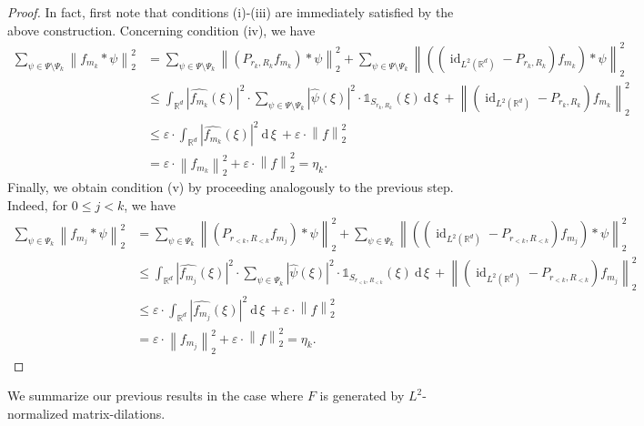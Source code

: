 \documentclass[11pt]{amsart}
\newcommand{\R}{{\mathbb{R}}}
\newcommand{\dxi}{\:\mathrm{d}\,\xi\:}
\newcommand{\norm}[1]{\ensuremath{\left\lVert\text{}#1\text{}\right\rVert}}
\DeclareMathOperator{\id}{id}
\newenvironment{proof sketch} {\textit{Proof sketch.}}{}
\begin{document}
\begin{proof}
    In fact, first note that conditions (i)-(iii) are immediately satisfied by the above construction. Concerning condition (iv), we have 
      \begin{align*}
        \sum_{\psi \in \Psi\setminus\Psi_k} \norm{f_{m_k}*\psi}_2^2 
        &= \sum_{\psi \in \Psi\setminus\Psi_k} \norm{(P_{r_k,R_k}f_{m_k})*\psi}_2^2 + \sum_{\psi \in \Psi\setminus\Psi_k} \norm{((\id_{L^2(\R^d)}-P_{r_k,R_k})f_{m_k})*\psi}_2^2 \\
        &\leq \int_{\R^d} |\widehat{f_{m_k}}(\xi)|^2 \cdot \sum_{\psi \in \Psi\setminus\Psi_k} |\widehat{\psi}(\xi)|^2 \cdot \mathds{1}_{S_{r_k,R_k}}(\xi)\dxi + \norm{(\id_{L^2(\R^d)}-P_{r_k,R_k})f_{m_k}}_2^2 \\
        &\leq \varepsilon \cdot \int_{\R^d} |\widehat{f_{m_k}}(\xi)|^2 \dxi + \varepsilon \cdot \norm{f}_2^2 \\
        &= \varepsilon \cdot \norm{f_{m_k}}_2^2+\varepsilon \cdot \norm{f}_2^2 = \eta_k.
      \end{align*}  
      Finally, we obtain condition (v) by proceeding analogously to the previous step. Indeed, for $0\leq j<k$, we have
      \begin{align*}
        \sum_{\psi \in \Psi_k} \norm{f_{m_j}*\psi}_2^2 
        &= \sum_{\psi \in \Psi_k} \norm{(P_{r_{<k},R_{<k}}f_{m_j})*\psi}_2^2 + \sum_{\psi \in \Psi_k} \norm{((\id_{L^2(\R^d)}-P_{r_{<k},R_{<k}})f_{m_j})*\psi}_2^2 \\
        &\leq \int_{\R^d} |\widehat{f_{m_j}}(\xi)|^2 \cdot \sum_{\psi \in \Psi_k} |\widehat{\psi}(\xi)|^2 \cdot \mathds{1}_{S_{r_{<k},R_{<k}}}(\xi)\dxi + \norm{(\id_{L^2(\R^d)}-P_{r_{<k},R_{<k}})f_{m_j}}_2^2 \\
        &\leq \varepsilon \cdot \int_{\R^d} |\widehat{f_{m_j}}(\xi)|^2 \dxi + \varepsilon \cdot \norm{f}_2^2 \\
        &= \varepsilon \cdot \norm{f_{m_j}}_2^2+\varepsilon \cdot \norm{f}_2^2 = \eta_k.
      \end{align*}
  \end{proof}
  
  We summarize our previous results in the case where $F$ is generated by $L^2$-normalized matrix-dilations.
  
\end{document}
